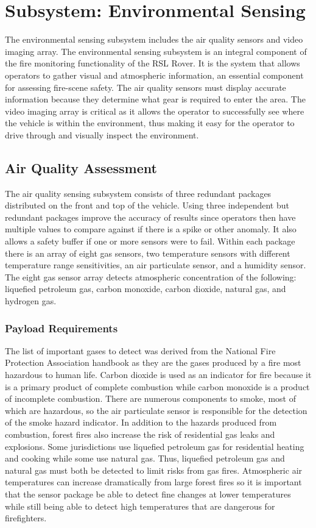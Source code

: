 \chapter{Subsystem: Environmental Sensing}


The environmental sensing subsystem includes the air quality sensors and video imaging array. The environmental sensing subsystem is an integral component of the fire monitoring functionality of the RSL Rover. It is the system that allows operators to gather visual and atmospheric information, an essential component for assessing fire-scene safety. The air quality sensors must display accurate information because they determine what gear is required to enter the area. The video imaging array is critical as it allows the operator to successfully see where the vehicle is within the environment, thus making it easy for the operator to drive through and visually inspect the environment. 

\section{Air Quality Assessment}

The air quality sensing subsystem consists of three redundant packages distributed on the front and top of the vehicle. Using three independent but redundant packages improve the accuracy of results since operators then have multiple values to compare against if there is a spike or other anomaly. It also allows a safety buffer if one or more sensors were to fail. Within each package there is an array of eight gas sensors, two temperature sensors with different temperature range sensitivities, an air particulate sensor, and a humidity sensor. The eight gas sensor array detects atmospheric concentration of the following: liquefied petroleum gas, carbon monoxide, carbon dioxide, natural gas, and hydrogen gas.

\subsection{Payload Requirements}

The list of important gases to detect was derived from the National Fire Protection Association handbook as they are the gases produced by a fire most hazardous to human life. Carbon dioxide is used as an indicator for fire because it is a primary product of complete combustion while carbon monoxide is a product of incomplete combustion. There are numerous components to smoke, most of which are hazardous, so the air particulate sensor is responsible for the detection of the smoke hazard indicator. In addition to the hazards produced from combustion, forest fires also increase the risk of residential gas leaks and explosions. Some jurisdictions use liquefied petroleum gas for residential heating and cooking while some use natural gas. Thus, liquefied petroleum gas and natural gas must both be detected to limit risks from gas fires. Atmospheric air temperatures can increase dramatically from large forest fires so it is important that the sensor package be able to detect fine changes at lower temperatures while still being able to detect high temperatures that are dangerous for firefighters. 

